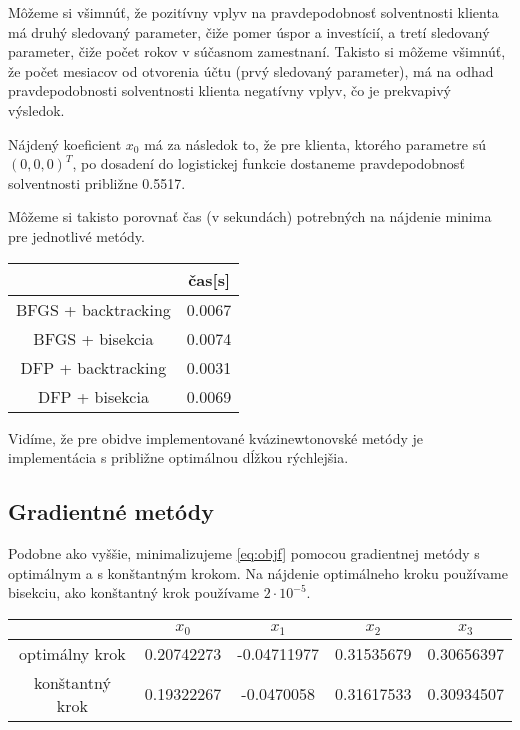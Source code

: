 \documentclass[report.tex]{subfiles}
\begin{document}
Môžeme si všimnúť, že pozitívny vplyv na pravdepodobnosť solventnosti klienta má druhý sledovaný parameter, čiže pomer úspor a investícií, a tretí sledovaný parameter, čiže počet rokov v súčasnom zamestnaní. Takisto si môžeme všimnúť, že počet mesiacov od otvorenia účtu (prvý sledovaný parameter), má na odhad pravdepodobnosti solventnosti klienta negatívny vplyv, čo je prekvapivý výsledok. 

Nájdený koeficient $x_0$ má za následok to, že pre klienta, ktorého parametre sú $(0,0,0)^T$, po dosadení do logistickej funkcie dostaneme pravdepodobnosť solventnosti približne 0.5517.

Môžeme si takisto porovnať čas (v sekundách) potrebných na nájdenie minima pre jednotlivé metódy.

\begin{center}
	\small
	\begin{tabular}{| c | c |}
		\hline
		& čas[s]  \\
		\hline
		BFGS + backtracking & 0.0067  \\
		BFGS + bisekcia & 0.0074  \\
		DFP + backtracking & 0.0031  \\
		DFP + bisekcia & 0.0069  \\
		\hline
	\end{tabular}
\end{center}

Vidíme, že pre obidve implementované kvázinewtonovské metódy je implementácia s približne optimálnou dĺžkou rýchlejšia.

\subsection{Gradientné metódy}

Podobne ako vyššie, minimalizujeme \ref{eq:objf} pomocou gradientnej metódy s optimálnym a s konštantným krokom. Na nájdenie optimálneho kroku používame bisekciu, ako konštantný krok používame $2\cdot 10^{-5}$.

\begin{center}
	\small
	\begin{tabular}{| c | c  c  c  c |}
		\hline
		& $x_0$ & $x_1$ & $x_2$ & $x_3$ \\
		\hline
		optimálny krok & 0.20742273 & -0.04711977 & 0.31535679 & 0.30656397 \\
		konštantný krok & 0.19322267 & -0.0470058 &  0.31617533 & 0.30934507 \\
		\hline
	\end{tabular}
\end{center}
\end{document}
